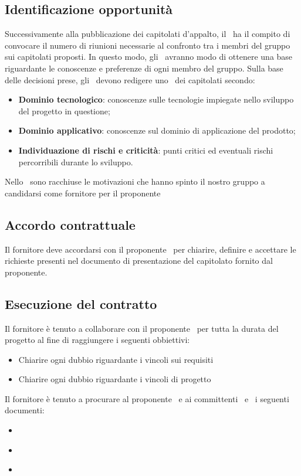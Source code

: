 \documentclass[../NormeDiProgetto.tex]{subfiles}
\begin{document}
		\subsection{Identificazione opportunità}
			Successivamente alla pubblicazione dei capitolati d'appalto, il
			\responsabilediprogetto\ ha il compito di convocare il numero
			di riunioni necessarie al confronto tra i membri del gruppo sui
			capitolati proposti. In questo modo, gli \analisti\ avranno modo
			di ottenere una base riguardante le conoscenze e preferenze di ogni
			membro del gruppo. Sulla base delle decisioni prese, gli
			\analisti\ devono redigere uno \studiodifattibilita\
			dei capitolati secondo:
			\begin{itemize}
				\item \textbf{Dominio tecnologico}: conoscenze sulle
				tecnologie impiegate nello sviluppo del progetto in questione;
				\item \textbf{Dominio applicativo}: conoscenze sul dominio di
				applicazione del prodotto;
				\item \textbf{Individuazione di rischi e criticità}: punti
				critici ed eventuali rischi percorribili durante lo sviluppo.
			\end{itemize}
			Nello \studiodifattibilita\ sono racchiuse le motivazioni che hanno spinto il nostro gruppo a candidarsi come fornitore per il proponente \proponente\
		\subsection{Accordo contrattuale}
			Il fornitore deve accordarsi con il proponente \proponente\ per chiarire, definire e accettare le richieste presenti nel documento di presentazione del capitolato fornito dal proponente.
		\subsection{Esecuzione del contratto}
			Il fornitore è tenuto a collaborare con il proponente \proponente\ per tutta la durata del progetto al fine di raggiungere i seguenti obbiettivi:
			\begin{itemize}
				\item Chiarire ogni dubbio riguardante i vincoli sui requisiti
				\item Chiarire ogni dubbio riguardante i vincoli di progetto
			\end{itemize}
			Il fornitore è tenuto a procurare al proponente \proponente\ e ai committenti \vardanega\ e \cardin\ i seguenti documenti:
			\begin{itemize}
				\item \pianodiprogetto\
				\item \analisideirequisiti\
				\item \pianodiqualifica\
			\end{itemize}
\end{document}
